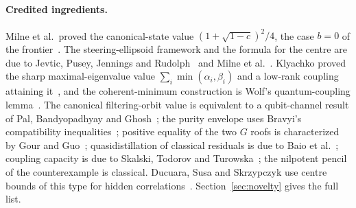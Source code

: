 \documentclass[11pt,a4paper]{article}
\theoremstyle{remark}\newtheorem{remark}[theorem]{Remark}
\begin{document}
\paragraph{Credited ingredients.}
Milne et al.\ proved the canonical-state value $(1+\sqrt{1-c})^2/4$, the
case $b=0$ of the frontier~\cite{milne2014}. The steering-ellipsoid framework
and the formula for the centre are due to Jevtic, Pusey, Jennings and
Rudolph~\cite{ellipsoid2014} and Milne et al.~\cite{milnegeometry}.
Klyachko proved the sharp maximal-eigenvalue value
$\sum_i\min(\alpha_i,\beta_i)$ and a low-rank coupling attaining
it~\cite{klyachko}, and the coherent-minimum construction is Wolf's
quantum-coupling lemma~\cite{wolf}. The canonical filtering-orbit value is
equivalent to a qubit-channel result of Pal, Bandyopadhyay and
Ghosh~\cite{pal}; the purity envelope uses Bravyi's compatibility
inequalities~\cite{bravyi}; positive equality of the two $G$ roofs is
characterized by Gour and Guo~\cite{gourguo}; quasidistillation of classical
residuals is due to Baio et al.~\cite{baio}; coupling capacity is due to
Skalski, Todorov and Turowska~\cite{capacity2025}; the nilpotent pencil of
the counterexample is classical. Ducuara, Susa and Skrzypczyk use centre
bounds of this type for hidden correlations~\cite{ducuara}. Section~\ref{sec:novelty}
gives the full list.
\end{document}
